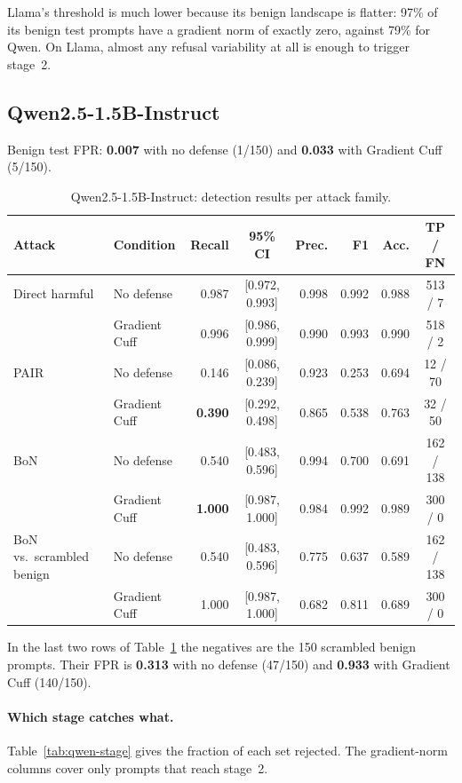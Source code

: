 \documentclass[11pt,a4paper]{article}
\begin{document}
Llama's threshold is much lower because its benign landscape is flatter: 97\% of its benign test prompts have a gradient norm of exactly zero, against 79\% for Qwen. On Llama, almost any refusal variability at all is enough to trigger stage~2.

\subsection{Qwen2.5-1.5B-Instruct}

Benign test FPR: \textbf{0.007} with no defense (1/150) and \textbf{0.033} with Gradient Cuff (5/150).

\begin{table}[h]
\centering
\caption{Qwen2.5-1.5B-Instruct: detection results per attack family.}
\label{tab:qwen}
\small
\setlength{\tabcolsep}{4pt}
\begin{tabular}{llrcrrrc}
\toprule
Attack & Condition & Recall & 95\% CI & Prec. & F1 & Acc. & TP / FN \\
\midrule
Direct harmful & No defense    & 0.987 & [0.972, 0.993] & 0.998 & 0.992 & 0.988 & 513 / 7 \\
               & Gradient Cuff & 0.996 & [0.986, 0.999] & 0.990 & 0.993 & 0.990 & 518 / 2 \\
\addlinespace
PAIR           & No defense    & 0.146 & [0.086, 0.239] & 0.923 & 0.253 & 0.694 & 12 / 70 \\
               & Gradient Cuff & \textbf{0.390} & [0.292, 0.498] & 0.865 & 0.538 & 0.763 & 32 / 50 \\
\addlinespace
BoN            & No defense    & 0.540 & [0.483, 0.596] & 0.994 & 0.700 & 0.691 & 162 / 138 \\
               & Gradient Cuff & \textbf{1.000} & [0.987, 1.000] & 0.984 & 0.992 & 0.989 & 300 / 0 \\
\addlinespace
BoN vs.\ scrambled benign & No defense    & 0.540 & [0.483, 0.596] & 0.775 & 0.637 & 0.589 & 162 / 138 \\
                          & Gradient Cuff & 1.000 & [0.987, 1.000] & 0.682 & 0.811 & 0.689 & 300 / 0 \\
\bottomrule
\end{tabular}
\end{table}

In the last two rows of Table~\ref{tab:qwen} the negatives are the 150 scrambled benign prompts. Their FPR is \textbf{0.313} with no defense (47/150) and \textbf{0.933} with Gradient Cuff (140/150).

\paragraph{Which stage catches what.} Table~\ref{tab:qwen-stage} gives the fraction of each set rejected. The gradient-norm columns cover only prompts that reach stage~2.
\end{document}
